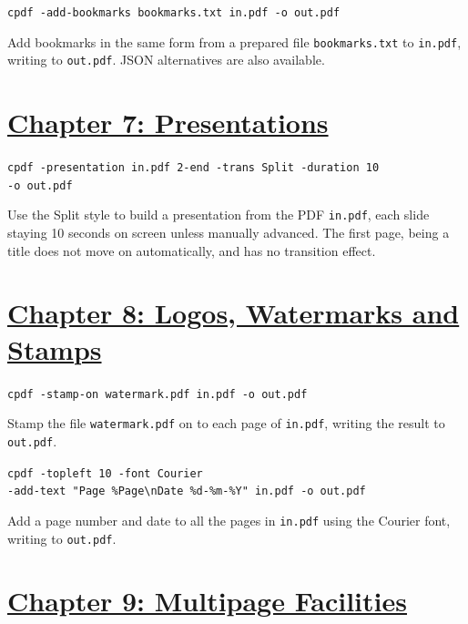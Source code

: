 \documentclass{book}
\begin{document}
\begin{framed}\noindent\texttt{cpdf -add-bookmarks bookmarks.txt in.pdf -o out.pdf}\end{framed}

\noindent Add bookmarks in the same form from a prepared file \texttt{bookmarks.txt} to \texttt{in.pdf}, writing to \texttt{out.pdf}. JSON alternatives are also available.

\section*{\hyperref[chap:7]{Chapter 7: Presentations}}

\begin{framed}\noindent\texttt{cpdf -presentation in.pdf 2-end -trans Split -duration 10\\\phantom{\ \ \ \ } -o out.pdf}\end{framed}

\noindent Use the Split style to build a presentation from the PDF \texttt{in.pdf}, each slide staying 10 seconds on screen unless manually advanced. The first page, being a title does not move on automatically, and has no transition effect.

\section*{\hyperref[chap:8]{Chapter 8: Logos, Watermarks and Stamps}}

\begin{framed}\noindent\texttt{cpdf -stamp-on watermark.pdf in.pdf -o out.pdf}\end{framed}

\noindent Stamp the file \texttt{watermark.pdf} on to each page of \texttt{in.pdf}, writing the result to \texttt{out.pdf}.

\begin{framed}\noindent\texttt{cpdf -topleft 10 -font Courier\\ \phantom{\ \ \ \ } -add-text "Page \%Page\textbackslash nDate \%d-\%m-\%Y" in.pdf -o out.pdf}\end{framed}

\noindent Add a page number and date to all the pages in \texttt{in.pdf} using the Courier font, writing to \texttt{out.pdf}.

\section*{\hyperref[chap:9]{Chapter 9: Multipage Facilities}}
\end{document}
